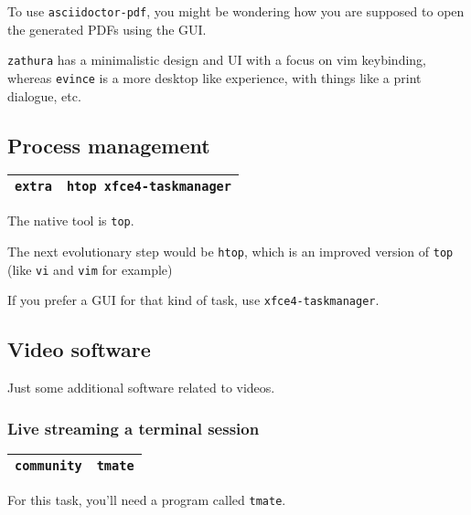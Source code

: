 \documentclass[9pt]{report}
\begin{document}
To use \texttt{asciidoctor-pdf}, you might be wondering how you are supposed to open the generated PDFs using the GUI.


\texttt{zathura} has a minimalistic design and UI with a focus on vim keybinding, whereas \texttt{evince} is a more desktop like experience, with things like a print dialogue, etc.



\vfill\eject

\hypertarget{x-process-management}{\subsection{Process management}}
\begin{center}
\begin{tabular}{|c|c|}
\hline
\texttt{extra} & \texttt{htop xfce4-taskmanager} \\ 
\hline
\end{tabular}
\end{center}

The native tool is \texttt{top}.


The next evolutionary step would be \texttt{htop}, which is an improved version of \texttt{top} (like \texttt{vi} and \texttt{vim} for example)


If you prefer a GUI for that kind of task, use \texttt{xfce4-taskmanager}.



\vfill\eject

\hypertarget{x-video-software}{\subsection{Video software}}
Just some additional software related to videos.



\vfill\eject

\hypertarget{x-live-streaming-a-terminal-session}{\subsubsection{Live streaming a terminal session}}
\begin{center}
\begin{tabular}{|c|c|}
\hline
\texttt{community} & \texttt{tmate} \\ 
\hline
\end{tabular}
\end{center}

For this task, you’ll need a program called \texttt{tmate}.
\end{document}
